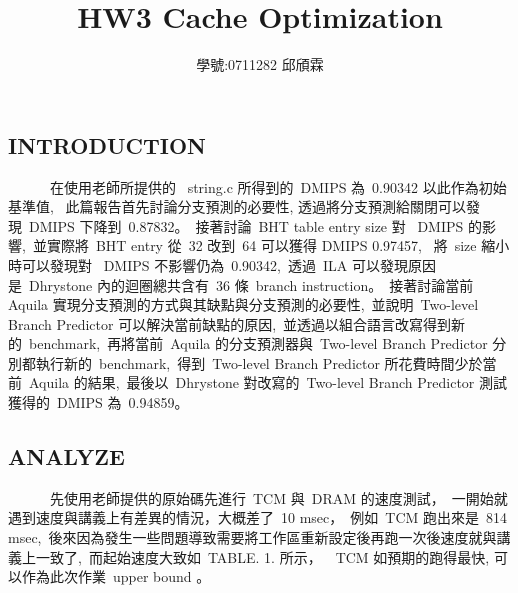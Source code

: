 \documentclass{article}
\title{\textbf{\LARGE {HW3 Cache Optimization}}}
\author{學號:0711282 邱頎霖}
\date{}
\begin{document}
\begin{CJK*}{UTF8}{bsmi}
\setlength{\columnsep}{1cm}

\vspace*{-50pt}
    {\let\newpage\relax\maketitle}

\begin{multicols}{2}

\begin{center}
    \section*{INTRODUCTION}
\end{center}

\begin{flushleft}
    \ \ \ \ \ \ 在使用老師所提供的 \ string.c 所得到的\ DMIPS 為\ 0.90342 以此作為初始基準值, \
    此篇報告首先討論分支預測的必要性, 透過將分支預測給關閉可以發現\ DMIPS 下降到\ 0.87832。\
    接著討論\ BHT table entry size 對 \ DMIPS 的影響,\
    並實際將\ BHT entry 從\ 32 改到\ 64 可以獲得 DMIPS 0.97457, \
    將\ size 縮小時可以發現對 \ DMIPS 不影響仍為\ 0.90342,\
    透過\ ILA 可以發現原因是\ Dhrystone 內的迴圈總共含有\ 36 條\ branch instruction。\
    接著討論當前 Aquila 實現分支預測的方式與其缺點與分支預測的必要性,\
    並說明\ Two-level Branch Predictor 可以解決當前缺點的原因,\
    並透過以組合語言改寫得到新的\ benchmark,\
    再將當前\ Aquila 的分支預測器與\ Two-level Branch Predictor 分別都執行新的\ benchmark,\
    得到\ Two-level Branch Predictor 所花費時間少於當前\ Aquila 的結果,\
    最後以\ Dhrystone 對改寫的\ Two-level Branch Predictor 測試獲得的\ DMIPS 為\ 0.94859。
\end{flushleft}

\begin{center}
    \section*{ANALYZE}
\end{center}

\begin{flushleft}
    \ \ \ \ \ \ 先使用老師提供的原始碼先進行\ TCM 與\ DRAM 的速度測試，\
    一開始就遇到速度與講義上有差異的情況，大概差了\ 10 msec，\
    例如\ TCM 跑出來是\ 814 msec,\
    後來因為發生一些問題導致需要將工作區重新設定後再跑一次後速度就與講義上一致了,\
    而起始速度大致如\ TABLE. 1. 所示，\
    \ TCM 如預期的跑得最快, 可以作為此次作業\ upper bound 。\
\end{flushleft}


\end{multicols}
\end{CJK*}
\end{document}
